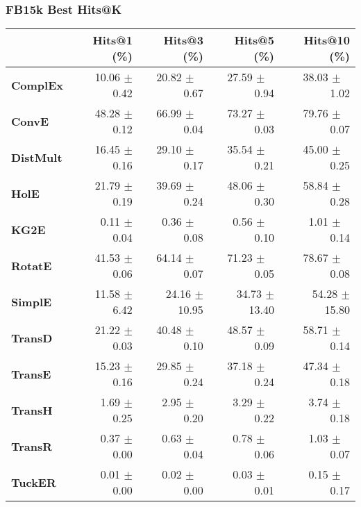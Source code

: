 \documentclass{article}
\begin{document}
\subsubsection{FB15k Best Hits@K}
    \begin{center}
    \begin{tabular}{lrrrr}
\toprule
{} &   Hits@1 (\%) &    Hits@3 (\%) &    Hits@5 (\%) &   Hits@10 (\%) \\
\midrule
\textbf{ComplEx } &  10.06 $\pm$ 0.42 &  20.82 $\pm$ $\phantom{5}$0.67 &  27.59 $\pm$ $\phantom{5}$0.94 &  38.03 $\pm$ $\phantom{5}$1.02 \\
\textbf{ConvE   } &  48.28 $\pm$ 0.12 &  66.99 $\pm$ $\phantom{5}$0.04 &  73.27 $\pm$ $\phantom{5}$0.03 &  79.76 $\pm$ $\phantom{5}$0.07 \\
\textbf{DistMult} &  16.45 $\pm$ 0.16 &  29.10 $\pm$ $\phantom{5}$0.17 &  35.54 $\pm$ $\phantom{5}$0.21 &  45.00 $\pm$ $\phantom{5}$0.25 \\
\textbf{HolE    } &  21.79 $\pm$ 0.19 &  39.69 $\pm$ $\phantom{5}$0.24 &  48.06 $\pm$ $\phantom{5}$0.30 &  58.84 $\pm$ $\phantom{5}$0.28 \\
\textbf{KG2E    } &  $\phantom{5}$0.11 $\pm$ 0.04 &  $\phantom{5}$0.36 $\pm$ $\phantom{5}$0.08 &  $\phantom{5}$0.56 $\pm$ $\phantom{5}$0.10 &  $\phantom{5}$1.01 $\pm$ $\phantom{5}$0.14 \\
\textbf{RotatE  } &  41.53 $\pm$ 0.06 &  64.14 $\pm$ $\phantom{5}$0.07 &  71.23 $\pm$ $\phantom{5}$0.05 &  78.67 $\pm$ $\phantom{5}$0.08 \\
\textbf{SimplE  } &  11.58 $\pm$ 6.42 &  24.16 $\pm$ 10.95 &  34.73 $\pm$ 13.40 &  54.28 $\pm$ 15.80 \\
\textbf{TransD  } &  21.22 $\pm$ 0.03 &  40.48 $\pm$ $\phantom{5}$0.10 &  48.57 $\pm$ $\phantom{5}$0.09 &  58.71 $\pm$ $\phantom{5}$0.14 \\
\textbf{TransE  } &  15.23 $\pm$ 0.16 &  29.85 $\pm$ $\phantom{5}$0.24 &  37.18 $\pm$ $\phantom{5}$0.24 &  47.34 $\pm$ $\phantom{5}$0.18 \\
\textbf{TransH  } &  $\phantom{5}$1.69 $\pm$ 0.25 &  $\phantom{5}$2.95 $\pm$ $\phantom{5}$0.20 &  $\phantom{5}$3.29 $\pm$ $\phantom{5}$0.22 &  $\phantom{5}$3.74 $\pm$ $\phantom{5}$0.18 \\
\textbf{TransR  } &  $\phantom{5}$0.37 $\pm$ 0.00 &  $\phantom{5}$0.63 $\pm$ $\phantom{5}$0.04 &  $\phantom{5}$0.78 $\pm$ $\phantom{5}$0.06 &  $\phantom{5}$1.03 $\pm$ $\phantom{5}$0.07 \\
\textbf{TuckER  } &  $\phantom{5}$0.01 $\pm$ 0.00 &  $\phantom{5}$0.02 $\pm$ $\phantom{5}$0.00 &  $\phantom{5}$0.03 $\pm$ $\phantom{5}$0.01 &  $\phantom{5}$0.15 $\pm$ $\phantom{5}$0.17 \\
\bottomrule
\end{tabular}

    \end{center}
\end{document}
